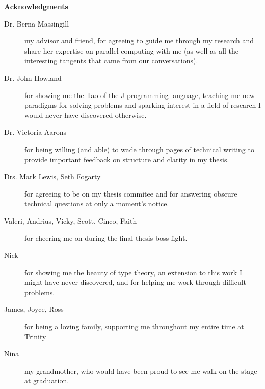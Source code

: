 \begin{center}

\bigskip

\begin{Large}
\textbf{Acknowledgments}
\end{Large}

\bigskip

\end{center}

\begin{description}
	\item[Dr. Berna Massingill] my advisor and friend, for agreeing to guide me through my research and 
		share her expertise on parallel computing with me (as well as all the interesting tangents that came from our conversations).
	\item[Dr. John Howland] for showing me the Tao of the J programming language, 
		teaching me new paradigms for solving problems and 
		sparking interest in a field of research I would never have discovered otherwise.
	\item[Dr. Victoria Aarons] for being willing (and able) to wade through pages of technical writing 
		to provide important feedback on structure and clarity in my thesis. 
	\item[Drs. Mark Lewis, Seth Fogarty] for agreeing to be on my thesis commitee and 
		for answering obscure technical questions at only a moment's notice.
	\item[Valeri, Andrius, Vicky, Scott, Cinco, Faith] for cheering me on during the final thesis boss-fight.
	\item[Nick] for showing me the beauty of type theory, an extension to this work I might have never discovered, 
		and for helping me work through difficult problems.
	\item[James, Joyce, Ross] for being a loving family, supporting me throughout my entire time at Trinity
	\item[Nina] my grandmother, who would have been proud to see me walk on the stage at graduation.
\end{description}
